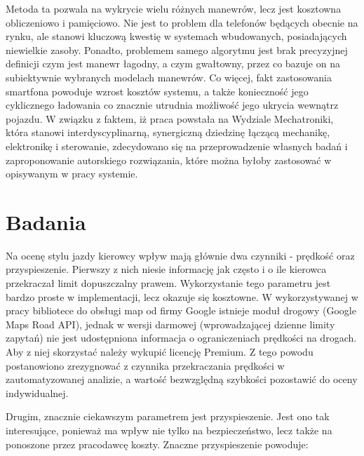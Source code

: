 Metoda ta pozwala na wykrycie wielu różnych manewrów, lecz jest kosztowna obliczeniowo i pamięciowo. Nie jest to problem dla telefonów będących obecnie na rynku, ale stanowi kluczową kwestię w systemach wbudowanych, posiadających niewielkie zasoby. Ponadto, problemem samego algorytmu jest brak precyzyjnej definicji czym jest manewr łagodny, a czym gwałtowny, przez co bazuje on na subiektywnie wybranych modelach manewrów. Co więcej, fakt zastosowania smartfona powoduje wzrost kosztów systemu, a także konieczność jego cyklicznego ładowania co znacznie utrudnia możliwość jego ukrycia wewnątrz pojazdu.
W związku z faktem, iż praca powstała na Wydziale Mechatroniki, która stanowi interdyscyplinarną, synergiczną dziedzinę łączącą mechanikę, elektronikę i sterowanie, zdecydowano się na przeprowadzenie własnych badań i zaproponowanie autorskiego rozwiązania, które można byłoby zastosować w opisywanym w pracy systemie.

\section{Badania}
\label{experiments}

Na ocenę stylu jazdy kierowcy wpływ mają głównie dwa czynniki - prędkość oraz przyspieszenie. Pierwszy z nich niesie informację jak często i o ile kierowca przekraczał limit dopuszczalny prawem. Wykorzystanie tego parametru jest bardzo proste w implementacji, lecz okazuje się kosztowne. W wykorzystywanej w pracy bibliotece do obsługi map od firmy Google istnieje moduł drogowy (Google Maps Road API\cite{google_map_road_api}), jednak w wersji darmowej (wprowadzającej dzienne limity zapytań) nie jest udostępniona informacja o ograniczeniach prędkości na drogach. Aby z niej skorzystać należy wykupić licencję Premium. Z tego powodu postanowiono zrezygnować z czynnika przekraczania prędkości w zautomatyzowanej analizie, a wartość bezwzględną szybkości pozostawić do oceny indywidualnej.

Drugim, znacznie ciekawszym parametrem jest przyspieszenie. Jest ono tak interesujące, ponieważ ma wpływ nie tylko na bezpieczeństwo, lecz także na ponoszone przez pracodawcę koszty. Znaczne przyspieszenie powoduje:

